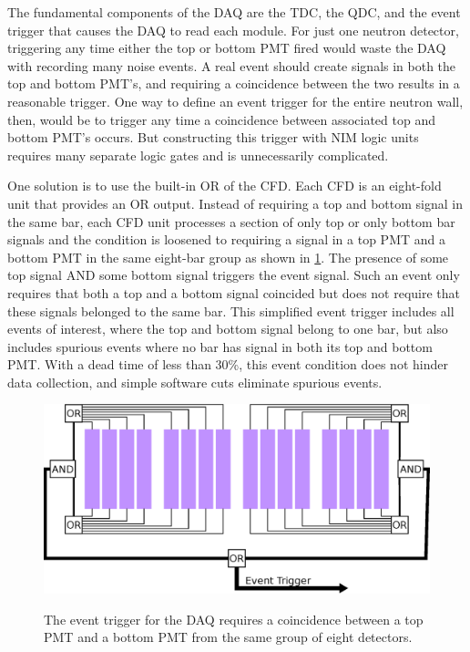 The fundamental components of the DAQ are the TDC, the QDC, and the event trigger that causes the DAQ to read each module.  For just one neutron detector, triggering any time either the top or bottom PMT fired would waste the DAQ with recording many noise events.  A real event should create signals in both the top and bottom PMT's, and requiring a coincidence between the two results in a reasonable trigger.  One way to define an event trigger for the entire neutron wall, then, would be to trigger any time a coincidence between associated top and bottom PMT's occurs.  But constructing this trigger with NIM logic units requires many separate logic gates and is unnecessarily complicated.  

One solution is to use the built-in OR of the CFD.  Each CFD is an eight-fold unit that provides an OR output.  Instead of requiring a top and bottom signal in the same bar, each CFD unit processes a section of only top or only bottom bar signals and the condition is loosened to requiring a signal in a top PMT and a bottom PMT in the same eight-bar group as shown in \ref{fig:eventTrig}.  The presence of some top signal AND some bottom signal triggers the event signal.  Such an event only requires that both a top and a bottom signal coincided but does not require that these signals belonged to the same bar.  This simplified event trigger includes all events of interest, where the top and bottom signal belong to one bar, but also includes spurious events where no bar has signal in both its top and bottom PMT.  With a dead time of less than 30\%, this event condition does not hinder data collection, and simple software cuts eliminate spurious events.

\begin{figure}[htp]
\centering
\includegraphics[width=1.0\textwidth]{figures/event_trigger.eps}
\label{fig:eventTrig}
\caption{The event trigger for the DAQ requires a coincidence between a top PMT and a bottom PMT from the same group of eight detectors.}
\end{figure}


